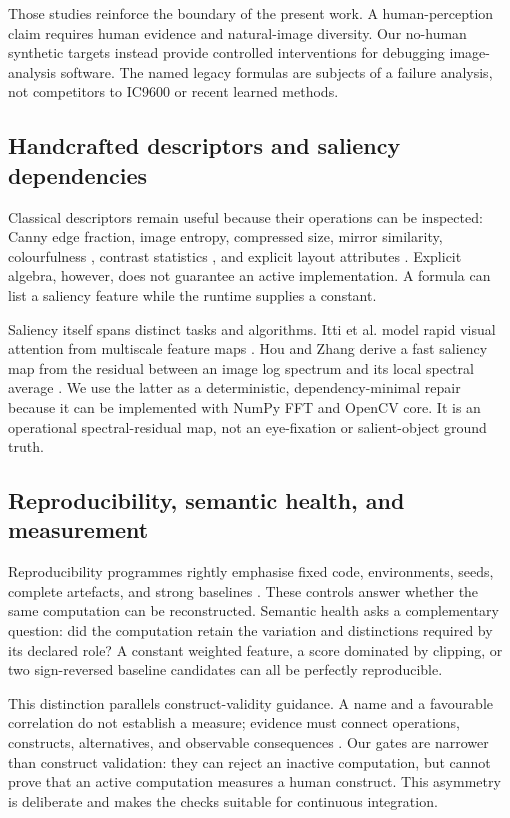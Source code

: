 Those studies reinforce the boundary of the present work. A human-perception claim requires human evidence and natural-image diversity. Our no-human synthetic targets instead provide controlled interventions for debugging image-analysis software. The named legacy formulas are subjects of a failure analysis, not competitors to IC9600 or recent learned methods.

\subsection{Handcrafted descriptors and saliency dependencies}

Classical descriptors remain useful because their operations can be inspected: Canny edge fraction, image entropy, compressed size, mirror similarity, colourfulness \citep{hasler2003colourfulness}, contrast statistics \citep{peli1990contrast}, and explicit layout attributes \citep{ngo2003interface}. Explicit algebra, however, does not guarantee an active implementation. A formula can list a saliency feature while the runtime supplies a constant.

Saliency itself spans distinct tasks and algorithms. Itti et al. model rapid visual attention from multiscale feature maps \citep{itti1998saliency}. Hou and Zhang derive a fast saliency map from the residual between an image log spectrum and its local spectral average \citep{hou2007spectral}. We use the latter as a deterministic, dependency-minimal repair because it can be implemented with NumPy FFT and OpenCV core. It is an operational spectral-residual map, not an eye-fixation or salient-object ground truth.

\subsection{Reproducibility, semantic health, and measurement}

Reproducibility programmes rightly emphasise fixed code, environments, seeds, complete artefacts, and strong baselines \citep{pineau2021reproducibility}. These controls answer whether the same computation can be reconstructed. Semantic health asks a complementary question: did the computation retain the variation and distinctions required by its declared role? A constant weighted feature, a score dominated by clipping, or two sign-reversed baseline candidates can all be perfectly reproducible.

This distinction parallels construct-validity guidance. A name and a favourable correlation do not establish a measure; evidence must connect operations, constructs, alternatives, and observable consequences \citep{cronbach1955construct,flake2020measurement}. Our gates are narrower than construct validation: they can reject an inactive computation, but cannot prove that an active computation measures a human construct. This asymmetry is deliberate and makes the checks suitable for continuous integration.

